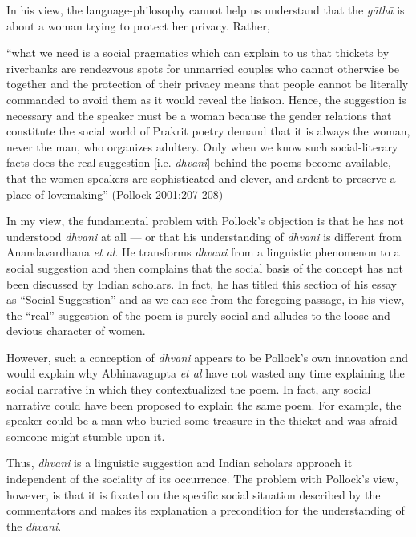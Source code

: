 In his view, the language-philosophy cannot help us understand that the \textsl{gāthā} is about a woman trying to protect her privacy. Rather, 

\newpage

\begin{myquote}
``what we need is a social pragmatics which can explain to us that thickets by riverbanks are rendezvous spots for unmarried couples who cannot otherwise be together and the protection of their privacy means that people cannot be literally commanded to avoid them as it would reveal the liaison. Hence, the suggestion is necessary and the speaker must be a woman because the gender relations that constitute the social world of Prakrit poetry demand that it is always the woman, never the man, who organizes adultery. Only when we know such social-literary facts does the real suggestion [i.e. \textsl{dhvani}] behind the poems become available, that the women speakers are sophisticated and clever, and ardent to preserve a place of lovemaking''
\hfill (Pollock 2001:207-208)
\end{myquote}

In my view, the fundamental problem with Pollock's objection is that he has not understood \textsl{dhvani} at all --- or that his understanding of \textsl{dhvani} is different from Ānandavardhana \textsl{et al}. He transforms \textsl{dhvani} from a linguistic phenomenon to a social suggestion and then complains that the social basis of the concept has not been discussed by Indian scholars. In fact, he has titled this section of his essay as ``Social Suggestion'' and as we can see from the foregoing passage, in his view, the ``real'' suggestion of the poem is purely social and alludes to the loose and devious character of women. 

However, such a conception of \textsl{dhvani} appears to be Pollock's own innovation and would explain why Abhinavagupta \textsl{et al} have not wasted any time explaining the social narrative in which they contextualized the poem. In fact, any social narrative could have been proposed to explain the same poem. For example, the speaker could be a man who buried some treasure in the thicket and was afraid someone might stumble upon it. 

Thus, \textsl{dhvani} is a linguistic suggestion and Indian scholars approach it independent of the sociality of its occurrence. The problem with Pollock's view, however, is that it is fixated on the specific social situation described by the commentators and makes its explanation a precondition for the understanding of the \textsl{dhvani}. 

